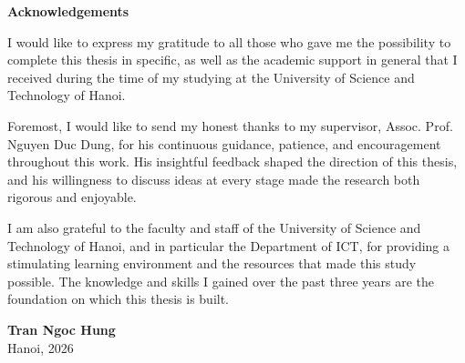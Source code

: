 \thispagestyle{fancy}
\begin{center}
    {\Large \textbf{Acknowledgements}}
\end{center}
\vspace{0.6cm}

I would like to express my gratitude to all those who gave me the possibility to
complete this thesis in specific, as well as the academic support in general that
I received during the time of my studying at the University of Science and
Technology of Hanoi.

Foremost, I would like to send my honest thanks to my supervisor, Assoc. Prof.
Nguyen Duc Dung, for his continuous guidance, patience, and encouragement
throughout this work. His insightful feedback shaped the direction of this
thesis, and his willingness to discuss ideas at every stage made the research
both rigorous and enjoyable.

I am also grateful to the faculty and staff of the University of Science and
Technology of Hanoi, and in particular the Department of ICT, for
providing a stimulating learning environment and the resources that made this
study possible. The knowledge and skills I gained over the past three years are
the foundation on which this thesis is built.


\vspace{0.6cm}
\noindent\hfill\textbf{Tran Ngoc Hung}\\
\null\hfill Hanoi, 2026
\clearpage
